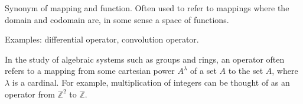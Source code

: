 \documentclass{article}
\begin{document}
Synonym of mapping and function. Often used to refer to mappings where the domain
and codomain are, in some sense a space of functions.

Examples: differential operator, convolution operator.

In the study of algebraic systems such as groups and rings, an operator often refers to a mapping from some cartesian power $A^{\lambda}$ of a set $A$ to the set $A$, where $\lambda$ is a cardinal.  For example, multiplication of integers can be thought of as an operator from $\mathbb{Z}^2$ to $\mathbb{Z}$.
\end{document}
